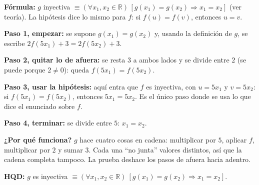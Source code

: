\documentclass[11pt]{article}
\begin{document}
\begin{center}
\end{center}


\begin{explica}
\textbf{Fórmula:} $g$ inyectiva $\equiv(\forall x_1,x_2\in\mathbb R)\,[g(x_1)=g(x_2)\Rightarrow x_1=x_2]$ (ver teoría). La hipótesis dice lo mismo para $f$: si $f(u)=f(v)$, entonces $u=v$.

\textbf{Paso 1, empezar:} se supone $g(x_1)=g(x_2)$ y, usando la definición de $g$, se escribe $2f(5x_1)+3=2f(5x_2)+3$.

\textbf{Paso 2, quitar lo de afuera:} se resta $3$ a ambos lados y se divide entre $2$ (se puede porque $2\neq0$): queda $f(5x_1)=f(5x_2)$.

\textbf{Paso 3, usar la hipótesis:} aquí entra que $f$ es inyectiva, con $u=5x_1$ y $v=5x_2$: si $f(5x_1)=f(5x_2)$, entonces $5x_1=5x_2$. Es el único paso donde se usa lo que dice el enunciado sobre $f$.

\textbf{Paso 4, terminar:} se divide entre $5$: $x_1=x_2$.

\textbf{¿Por qué funciona?} $g$ hace cuatro cosas en cadena: multiplicar por $5$, aplicar $f$, multiplicar por $2$ y sumar $3$. Cada una ``no junta'' valores distintos, así que la cadena completa tampoco. La prueba deshace los pasos de afuera hacia adentro.
\end{explica}

\textbf{HQD:} $g$ es inyectiva $\equiv(\forall x_1,x_2\in\mathbb R)\ [g(x_1)=g(x_2)\Rightarrow x_1=x_2]$.
\end{document}
